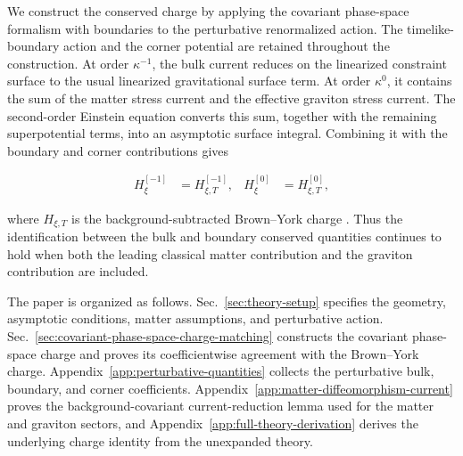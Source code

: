 We construct the conserved charge by applying the covariant phase-space formalism with boundaries \cite{Harlow:2019yfa} to the perturbative renormalized action. The timelike-boundary action and the corner potential are retained throughout the construction. At order $\kappa^{-1}$, the bulk current reduces on the linearized constraint surface to the usual linearized gravitational surface term. At order $\kappa^0$, it contains the sum of the matter stress current and the effective graviton stress current. The second-order Einstein equation converts this sum, together with the remaining superpotential terms, into an asymptotic surface integral. Combining it with the boundary and corner contributions gives

\begin{align}
H_{\xi}^{[-1]} & =H_{\xi,T}^{[-1]}, & H_{\xi}^{[0]} & =H_{\xi,T}^{[0]},
\end{align}

where $H_{\xi,T}$ is the background-subtracted Brown--York charge \cite{Brown:1992br}. Thus the identification between the bulk and boundary conserved quantities continues to hold when both the leading classical matter contribution and the graviton contribution are included.

The paper is organized as follows. Sec.~\ref{sec:theory-setup} specifies the geometry, asymptotic conditions, matter assumptions, and perturbative action. Sec.~\ref{sec:covariant-phase-space-charge-matching} constructs the covariant phase-space charge and proves its coefficientwise agreement with the Brown--York charge. Appendix~\ref{app:perturbative-quantities} collects the perturbative bulk, boundary, and corner coefficients. Appendix~\ref{app:matter-diffeomorphism-current} proves the background-covariant current-reduction lemma used for the matter and graviton sectors, and Appendix~\ref{app:full-theory-derivation} derives the underlying charge identity from the unexpanded theory.
